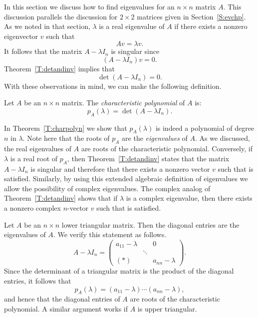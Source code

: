  \label{S:eig} 
 
In this section we discuss how to find eigenvalues for an
$n\times n$ matrix $A$.  This discussion parallels the
discussion for $2\times 2$ matrices given in
Section~\ref{S:evchp}.  As we noted in that section, $\lambda$
is a real eigenvalue of $A$ if there exists a nonzero
eigenvector $v$ such that
\begin{equation}  \label{e:eigen}
Av = \lambda v.
\end{equation}
It follows that the matrix $A-\lambda I_n$ is 
singular since
\[
(A-\lambda I_n)v = 0.
\]
Theorem~\ref{T:detandinv} implies that 
\[
\det(A-\lambda I_n) = 0.
\]
With these observations in mind, we can make the following definition.
\begin{Def}   \label{D:charpoly}
Let $A$ be an $n\times n$ matrix.  The {\em characteristic polynomial\/} 
of $A$ is:
\[
p_A(\lambda) = \det(A-\lambda I_n).
\]  
\end{Def}

In Theorem~\ref{T:charpolyn} we show that $p_A(\lambda)$ is indeed a 
polynomial of degree $n$ in $\lambda$.  Note here that the roots of 
$p_A$ are the {\em eigenvalues\/} of $A$. As we
discussed, the real eigenvalues 
of $A$ are roots of the
characteristic polynomial.   Conversely, if
$\lambda$ is a real root of $p_A$, then
Theorem~\ref{T:detandinv} states that the matrix $A-\lambda I_n$
is singular and therefore that there exists a nonzero vector $v$
such that  is satisfied.  Similarly, by using this
extended algebraic definition of eigenvalues we allow the
possibility of complex eigenvalues.  
The complex analog of
Theorem~\ref{T:detandinv} shows that if $\lambda$ is a complex
eigenvalue, then there exists a nonzero complex $n$-vector $v$
such that  is satisfied.

\begin{exam} \label{E:triangular}
Let $A$ be an $n\times n$ lower triangular matrix.  Then the
diagonal entries are the eigenvalues of $A$.  {\rm We verify
this statement as follows.  
\[
A-\lambda I_n = \left(\begin{array}{ccc} a_{11}-\lambda &  & 0 \\
 &  \ddots &  \\ (*) & & a_{nn}-\lambda \end{array}\right).
\]
Since the determinant of a triangular matrix is the product of
the diagonal entries, it follows that 
\begin{equation}  \label{e:triangpoly}
p_A(\lambda) = (a_{11}-\lambda)\cdots(a_{nn}-\lambda),
\end{equation}
and hence that the diagonal entries of $A$ are roots of the 
characteristic polynomial. A similar argument works if $A$ is
upper triangular.}
\end{exam}  
 
